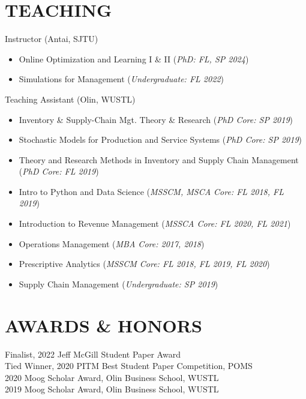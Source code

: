 \documentclass[margin]{res} %
\begin{document}
\begin{resume}
\section{TEACHING}
Instructor (Antai, SJTU)
\begin{itemize}
    \item Online Optimization and Learning I \& II ({\it PhD: FL, SP 2024})
    \item Simulations for Management ({\it Undergraduate: FL 2022})
\end{itemize}
Teaching Assistant (Olin, WUSTL)
\begin{itemize}
    \item Inventory \& Supply-Chain Mgt. Theory \& Research ({\it PhD Core: SP 2019})
    \item Stochastic Models for Production and Service Systems ({\it PhD Core: SP 2019})
    \item Theory and Research Methods in Inventory and Supply Chain Management ({\it PhD Core: FL 2019})
    \item Intro to Python and Data Science ({\it MSSCM, MSCA Core: FL 2018, FL 2019})		
    \item Introduction to Revenue Management ({\it MSSCA Core: FL 2020, FL 2021})
    \item Operations Management ({\it MBA Core: 2017, 2018})
    \item Prescriptive Analytics ({\it MSSCM Core: FL 2018, FL 2019, FL 2020})		
    \item Supply Chain Management ({\it Undergraduate: SP 2019})
\end{itemize}


\section{AWARDS \& HONORS} 
    Finalist, 2022 Jeff McGill Student Paper Award\\
    Tied Winner, 2020 PITM Best Student Paper Competition, POMS\\
    2020 Moog Scholar Award, Olin Business School, WUSTL\\
    2019 Moog Scholar Award, Olin Business School, WUSTL\\


\end{resume}
\end{document}
